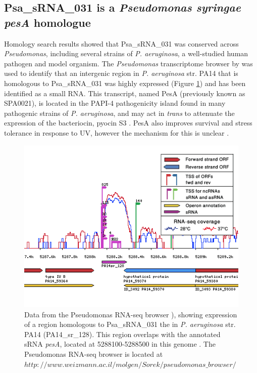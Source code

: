 \subsection{Psa\_sRNA\_031 is a \textit{Pseudomonas syringae} \textit{pesA} homologue}
Homology search results showed that Psa\_sRNA\_031 was conserved across \textit{Pseudomonas}, including several strains of \textit{P. aeruginosa}, a well-studied human pathogen and model organism. The \textit{Pseudomonas} transcriptome browser by \cite{Wurtzel_Lory_2012x} was used to identify that an intergenic region in \textit{P. aeruginosa} str. PA14 that is homologous to Psa\_sRNA\_031 was highly expressed (Figure \ref{fig:p_browser}) and has been identified as a small RNA. This transcript, named PesA (previously known as SPA0021), is located in the PAPI-4 pathogenicity island found in many pathogenic strains of \textit{P. aeruginosa}, and may act in \textit{trans} to attenuate the expression of the bacteriocin, pyocin S3 \citep{Ferrara2017-su}. PesA also improves survival and stress tolerance in response to UV, however the mechanism for this is unclear \citep{Ferrara2017-su}. 

\begin{figure}[H]
    \centering
    \includegraphics[scale=0.8]{psa/psa_ncRNA/pseudomonas_browser.png}
    \caption[Expression of a Psa\_sRNA\_031 homologue in \textit{P. aeruginosa}] {Data from the Pseudomonas RNA-seq browser \citep{Wurtzel_Lory_2012x}), showing expression of a region homologous to Psa\_sRNA\_031 the in \textit{P. aeruginosa} str. PA14 (PA14\_sr\_128). This region overlaps with the annotated sRNA \textit{pesA}, located at 5288100-5288500 in this genome \citep{Pita2018-bi}. The Pseudomonas RNA-seq browser is located at $http://www.weizmann.ac.il/molgen/Sorek/pseudomonas\_browser/$ }
    \label{fig:p_browser}
\end{figure}

